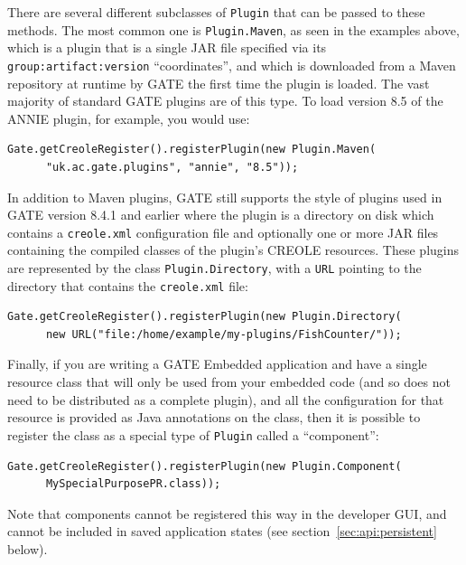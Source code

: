 There are several different subclasses of \texttt{Plugin} that can be passed
to these methods.  The most common one is \texttt{Plugin.Maven}, as seen in the
examples above, which is a plugin that is a single JAR file specified via its
\texttt{group:artifact:version} ``coordinates'', and which is downloaded from a
Maven repository at runtime by GATE the first time the plugin is loaded.  The
vast majority of standard GATE plugins are of this type.  To load version 8.5
of the ANNIE plugin, for example, you would use:
\begin{lstlisting}
Gate.getCreoleRegister().registerPlugin(new Plugin.Maven(
      "uk.ac.gate.plugins", "annie", "8.5"));
\end{lstlisting}

In addition to Maven plugins, GATE still supports the style of plugins used in
GATE version 8.4.1 and earlier where the plugin is a directory on disk
which contains a \texttt{creole.xml} configuration file and optionally one or
more JAR files containing the compiled classes of the plugin's CREOLE
resources.  These plugins are represented by the class
\texttt{Plugin.Directory}, with a \texttt{URL} pointing to the directory that
contains the \texttt{creole.xml} file:
\begin{lstlisting}
Gate.getCreoleRegister().registerPlugin(new Plugin.Directory(
      new URL("file:/home/example/my-plugins/FishCounter/"));
\end{lstlisting}

Finally, if you are writing a GATE Embedded application and have a single
resource class that will only be used from your embedded code (and so does not
need to be distributed as a complete plugin), and all the configuration for
that resource is provided as Java annotations on the class, then it is possible
to register the class as a special type of \texttt{Plugin} called a
``component'':
\begin{lstlisting}
Gate.getCreoleRegister().registerPlugin(new Plugin.Component(
      MySpecialPurposePR.class));
\end{lstlisting}

Note that components cannot be registered this way in the developer GUI, and
cannot be included in saved application states (see
section~\ref{sec:api:persistent} below).


